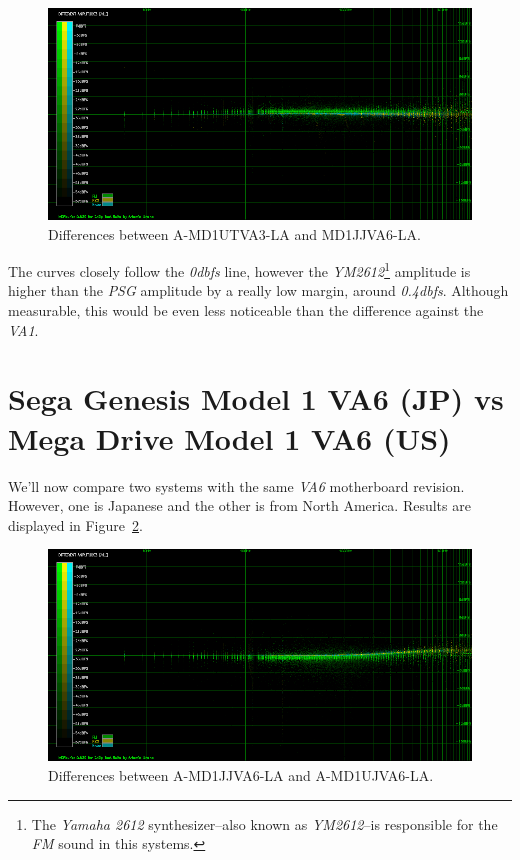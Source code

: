 \documentclass[10pt,a4paper]{report}
\newcommand{\db}[1]{\textit{\mbox{#1\acrshort{dbfs}}}}
\begin{document}
\begin{figure}[H]
	\centering
	\includegraphics[width=1.0\linewidth]{images/results/2-A-MD1UTVA3-LA_vs_A-MD1JJVA6-LA.png}
	\caption[A-MD1UTVA3-LA vs A-MD1JJVA6-LA]{Differences between A-MD1UTVA3-LA and MD1JJVA6-LA.}
	\label{fig:A-MD1UTVA3-LA_vs_A-MD1JJVA6-LA}
\end{figure}

The curves closely follow the \db{0} line, however the \textit{YM2612}\footnote{The \textit{Yamaha 2612} synthesizer--also known as \textit{YM2612}--is responsible for the \textit{FM} sound in this systems.} amplitude is higher than the \textit{PSG} amplitude by a really low margin, around \db{0.4}. Although measurable, this would be even less noticeable than the difference against the \textit{VA1}.

\section{Sega Genesis Model 1 VA6 (JP) vs\\ Mega Drive Model 1 VA6 (US)}

We'll now compare two systems with the same \textit{VA6} motherboard revision. However, one is Japanese and the other is from North America. Results are displayed in Figure~\ref{fig:A-MD1JJVA6-LA_vs_A-MD1UJVA6-LA}.

\begin{figure}[H]
	\centering
	\includegraphics[width=1.0\linewidth]{images/results/3-A-MD1JJVA6-LA_vs_A-MD1UJVA6-LA.png}
	\caption[A-MD1JJVA6-LA vs A-MD1UJVA6-LA]{Differences between A-MD1JJVA6-LA and A-MD1UJVA6-LA.}
	\label{fig:A-MD1JJVA6-LA_vs_A-MD1UJVA6-LA}
\end{figure}
\end{document}
